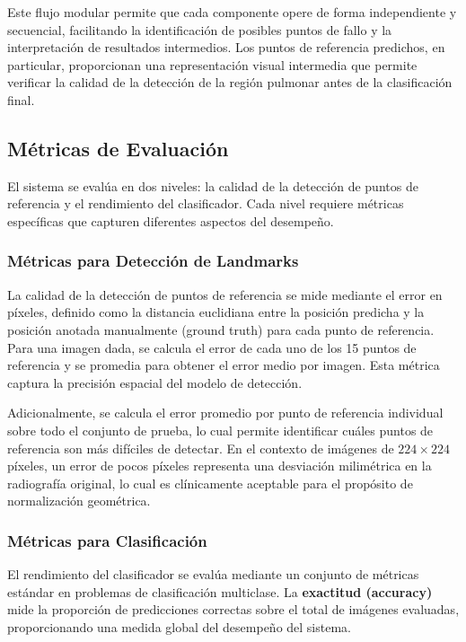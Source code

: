 Este flujo modular permite que cada componente opere de forma independiente y secuencial, facilitando la identificación de posibles puntos de fallo y la interpretación de resultados intermedios. Los puntos de referencia predichos, en particular, proporcionan una representación visual intermedia que permite verificar la calidad de la detección de la región pulmonar antes de la clasificación final.

\subsection{Métricas de Evaluación}
\label{subsec:metricas_evaluacion}

El sistema se evalúa en dos niveles: la calidad de la detección de puntos de referencia y el rendimiento del clasificador. Cada nivel requiere métricas específicas que capturen diferentes aspectos del desempeño.

\subsubsection{Métricas para Detección de Landmarks}
\label{subsubsec:metricas_landmarks}

La calidad de la detección de puntos de referencia se mide mediante el error en píxeles, definido como la distancia euclidiana entre la posición predicha y la posición anotada manualmente (ground truth) para cada punto de referencia. Para una imagen dada, se calcula el error de cada uno de los 15 puntos de referencia y se promedia para obtener el error medio por imagen. Esta métrica captura la precisión espacial del modelo de detección.

Adicionalmente, se calcula el error promedio por punto de referencia individual sobre todo el conjunto de prueba, lo cual permite identificar cuáles puntos de referencia son más difíciles de detectar. En el contexto de imágenes de $224 \times 224$ píxeles, un error de pocos píxeles representa una desviación milimétrica en la radiografía original, lo cual es clínicamente aceptable para el propósito de normalización geométrica.

\subsubsection{Métricas para Clasificación}
\label{subsubsec:metricas_clasificacion}

El rendimiento del clasificador se evalúa mediante un conjunto de métricas estándar en problemas de clasificación multiclase. La \textbf{exactitud (accuracy)} mide la proporción de predicciones correctas sobre el total de imágenes evaluadas, proporcionando una medida global del desempeño del sistema.

